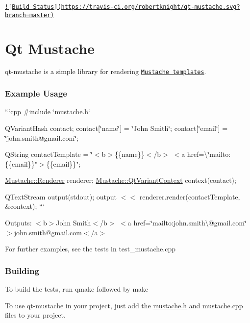 \href{https://travis-ci.org/robertknight/qt-mustache}{\tt !\mbox{[}Build Status\mbox{]}(https\+://travis-\/ci.\+org/robertknight/qt-\/mustache.\+svg?branch=master)}

\section*{Qt Mustache}

qt-\/mustache is a simple library for rendering \href{http://mustache.github.com/}{\tt Mustache templates}.

\subsubsection*{Example Usage}

```cpp \#include \char`\"{}mustache.\+h\char`\"{}

Q\+Variant\+Hash contact; contact\mbox{[}\char`\"{}name\char`\"{}\mbox{]} = \char`\"{}\+John Smith\char`\"{}; contact\mbox{[}\char`\"{}email\char`\"{}\mbox{]} = \char`\"{}john.\+smith@gmail.\+com\char`\"{};

Q\+String contact\+Template = \char`\"{}$<$b$>$\{\{name\}\}$<$/b$>$ $<$a href=\textbackslash{}\char`\"{}mailto\+:\{\{email\}\}"$>$\{\{email\}\}";

\hyperlink{classMustache_1_1Renderer}{Mustache\+::\+Renderer} renderer; \hyperlink{classMustache_1_1QtVariantContext}{Mustache\+::\+Qt\+Variant\+Context} context(contact);

Q\+Text\+Stream output(stdout); output $<$$<$ renderer.\+render(contact\+Template, \&context); ```

Outputs\+: {\ttfamily $<$b$>$John Smith$<$/b$>$ $<$a href=\char`\"{}mailto\+:john.\+smith\textbackslash{}@gmail.\+com\char`\"{}$>$john.\+smith@gmail.\+com$<$/a$>$}

For further examples, see the tests in {\ttfamily test\+\_\+mustache.\+cpp}

\subsubsection*{Building}


\begin{DoxyItemize}
\item To build the tests, run {\ttfamily qmake} followed by {\ttfamily make}
\item To use qt-\/mustache in your project, just add the {\ttfamily \hyperlink{mustache_8h_source}{mustache.\+h}} and {\ttfamily mustache.\+cpp} files to your project.
\end{DoxyItemize}

